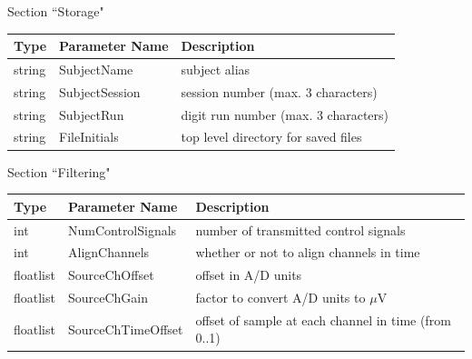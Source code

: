 \documentclass[letterpaper,oneside,12pt]{book}
\begin{document}
\begin{flushleft}
\vspace{.5cm}
\raggedright \large Section ``Storage" \normalsize
\\[2ex]
 \begin{tabular}{|l|l|l|}
  \hline
  \textbf{Type} & \textbf{Parameter Name} & \textbf{Description}\\
  \hline
  string & SubjectName & subject alias \\
  \hline
  string & SubjectSession & session number (max. 3 characters) \\
  \hline
  string & SubjectRun & digit run number (max. 3 characters) \\
  \hline
  string & FileInitials & top level directory for saved files \\
  \hline
 \end{tabular}

\vspace{.5cm}

\newpage

\large Section ``Filtering" \normalsize \\[1ex]

 \begin{tabular}{|l|l|l|}
  \hline
  \textbf{Type} & \textbf{Parameter Name} & \textbf{Description}\\
  \hline
  int & NumControlSignals & number of transmitted control signals \\
  \hline
  int & AlignChannels & whether or not to align channels in time \\
  \hline
  floatlist & SourceChOffset & offset in A/D units\\
  \hline
  floatlist & SourceChGain & factor to convert A/D units to $\mu$V \\
  \hline
  floatlist & SourceChTimeOffset & offset of sample at each channel in time (from 0..1) \\
  \hline
 \end{tabular}



\end{flushleft}
\end{document}
